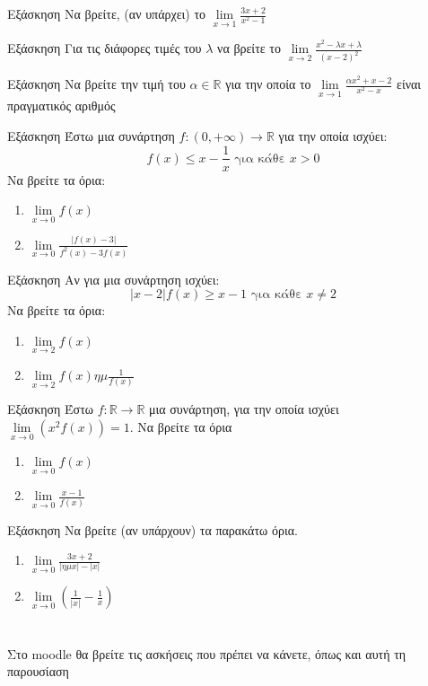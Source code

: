 \documentclass[greek]{beamer}
\begin{document}
\begin{frame}{Εξάσκηση}
 Να βρείτε, (αν υπάρχει) το $\lim\limits_{x \to 1}{ \frac{3x+2}{x^2-1} }$
\end{frame}

\begin{frame}{Εξάσκηση}
 Για τις διάφορες τιμές του $λ$ να βρείτε το $\lim\limits_{x \to 2}{ \frac{x^2-λx+λ}{(x-2)^2} }$
\end{frame}

\begin{frame}{Εξάσκηση}
 Να βρείτε την τιμή του $α\in\mathbb{R}$ για την οποία το $\lim\limits_{x \to 1}{\frac{αx^2+x-2}{x^2-x}  }$ είναι πραγματικός αριθμός
\end{frame}

\begin{frame}{Εξάσκηση}
 Έστω μια συνάρτηση $f:(0,+\infty)\to\mathbb{R}$ για την οποία ισχύει:
 $$f(x)\le x-\frac{1}{x} \text{ για κάθε } x>0$$
 Να βρείτε τα όρια:
 \begin{enumerate}
  \item $\lim\limits_{x \to 0}{ f(x) }$ \pause
  \item $\lim\limits_{x \to 0}{ \frac{|f(x)-3|}{f^2(x)-3f(x)} }$
 \end{enumerate}
\end{frame}

\begin{frame}{Εξάσκηση}
 Αν για μια συνάρτηση ισχύει:
 $$|x-2|f(x)\ge x-1 \text{ για κάθε } x\ne 2$$
 Να βρείτε τα όρια:
 \begin{enumerate}
  \item $\lim\limits_{x \to 2}{ f(x) }$ \pause
  \item $\lim\limits_{x \to 2}{ f(x)ημ\frac{1}{f(x)} }$
 \end{enumerate}
\end{frame}

\begin{frame}{Εξάσκηση}
 Έστω $f:\mathbb{R}\to\mathbb{R}$ μια συνάρτηση, για την οποία ισχύει $\lim\limits_{x \to 0}{ \left( x^2f(x)  \right)  }=1$.
 Να βρείτε τα όρια
 \begin{enumerate}
  \item $\lim\limits_{x \to 0}{ f(x) }$ \pause
  \item $\lim\limits_{x \to 0}{ \frac{x-1}{f(x)} }$
 \end{enumerate}
\end{frame}

\begin{frame}{Εξάσκηση}
 Να βρείτε (αν υπάρχουν) τα παρακάτω όρια.
 \begin{enumerate}
   \item $\lim\limits_{x \to 0}{ \frac{3x+2}{|ημx|-|x|} }$ \pause
   \item $\lim\limits_{x \to 0}{ \left( \frac{1}{|x|}-\frac{1}{x}  \right)  }$
 \end{enumerate}
\end{frame}

\section{}
\begin{frame}
 Στο moodle θα βρείτε τις ασκήσεις που πρέπει να κάνετε, όπως και αυτή τη παρουσίαση
\end{frame}
\end{document}
